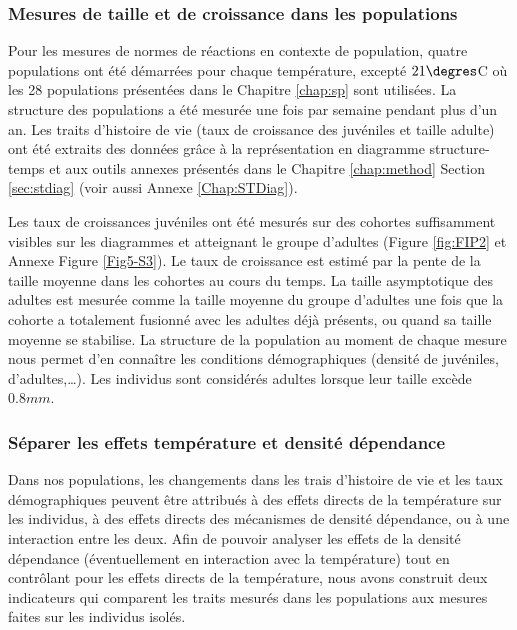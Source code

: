 \subsubsection{Mesures de taille et de croissance dans les populations}

Pour les mesures de normes de réactions en contexte de population, quatre
populations ont été démarrées pour chaque température, excepté $21\degres$C où
les 28 populations présentées dans le Chapitre \ref{chap:sp} sont utilisées. La
structure des populations a été mesurée une fois par semaine pendant plus d'un
an. Les traits d'histoire de vie (taux de croissance des juvéniles et taille
adulte) ont été extraits des données grâce à la représentation en diagramme
structure-temps et aux outils annexes présentés dans le Chapitre
\ref{chap:method} Section \ref{sec:stdiag} (voir aussi Annexe \ref{Chap:STDiag}). 

Les taux de croissances juvéniles ont été mesurés sur des cohortes suffisamment
visibles sur les diagrammes et atteignant le groupe d'adultes (Figure
\ref{fig:FIP2} et Annexe Figure \ref{Fig5-S3}).
Le taux de croissance est estimé par la pente de la taille moyenne dans les cohortes au
cours du temps. La taille asymptotique des adultes est mesurée comme la taille
moyenne du groupe d'adultes une fois que la cohorte a totalement fusionné avec
les adultes déjà présents, ou quand sa taille moyenne se stabilise. La structure
de la population au moment de chaque mesure nous permet d'en connaître les
conditions démographiques (densité de juvéniles, d'adultes,\ldots). Les
individus sont considérés adultes lorsque leur taille excède $0.8mm$.

\subsubsection{Séparer les effets température et densité dépendance}

Dans nos populations, les changements dans les trais d'histoire de vie et les
taux démographiques peuvent être attribués à des effets directs de la
température sur les individus, à des effets directs des mécanismes de densité dépendance, ou
à une interaction entre les deux. Afin de pouvoir analyser les effets de la
densité dépendance (éventuellement en interaction avec la température) tout en
contrôlant pour les effets directs de la température, nous avons construit deux
indicateurs qui comparent les traits mesurés dans les populations aux mesures
faites sur les individus isolés. 


